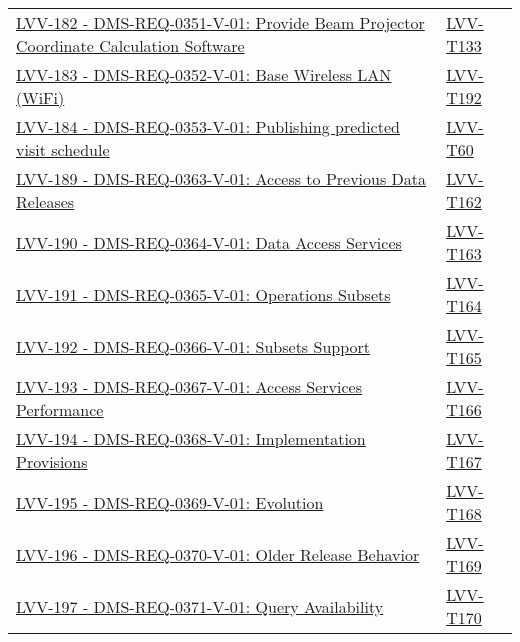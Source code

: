 \begin{longtable}[]{p{13cm}p{3cm}}
\href{https://jira.lsstcorp.org/browse/LVV-182}{LVV-182 -
DMS-REQ-0351-V-01: Provide Beam Projector Coordinate Calculation
Software} &
\protect\hyperlink{lvv-t133---verify-implementation-of-provide-beam-projector-coordinate-calculation-software-dms-req-0351}{LVV-T133}\tabularnewline
\href{https://jira.lsstcorp.org/browse/LVV-183}{LVV-183 -
DMS-REQ-0352-V-01: Base Wireless LAN (WiFi)} &
\protect\hyperlink{lvv-t192---verify-implementation-of-base-wireless-lan-wifi-dms-req-0352}{LVV-T192}\tabularnewline
\href{https://jira.lsstcorp.org/browse/LVV-184}{LVV-184 -
DMS-REQ-0353-V-01: Publishing predicted visit schedule} &
\protect\hyperlink{lvv-t60---verify-implementation-of-publishing-predicted-visit-schedule-dms-req-0353}{LVV-T60}\tabularnewline
\href{https://jira.lsstcorp.org/browse/LVV-189}{LVV-189 -
DMS-REQ-0363-V-01: Access to Previous Data Releases} &
\protect\hyperlink{lvv-t162---verify-implementation-of-access-to-previous-data-releases-dms-req-0363}{LVV-T162}\tabularnewline
\href{https://jira.lsstcorp.org/browse/LVV-190}{LVV-190 -
DMS-REQ-0364-V-01: Data Access Services} &
\protect\hyperlink{lvv-t163---verify-implementation-of-data-access-services-dms-req-0364}{LVV-T163}\tabularnewline
\href{https://jira.lsstcorp.org/browse/LVV-191}{LVV-191 -
DMS-REQ-0365-V-01: Operations Subsets} &
\protect\hyperlink{lvv-t164---verify-implementation-of-operations-subsets-dms-req-0365}{LVV-T164}\tabularnewline
\href{https://jira.lsstcorp.org/browse/LVV-192}{LVV-192 -
DMS-REQ-0366-V-01: Subsets Support} &
\protect\hyperlink{lvv-t165---verify-implementation-of-subsets-support-dms-req-0366}{LVV-T165}\tabularnewline
\href{https://jira.lsstcorp.org/browse/LVV-193}{LVV-193 -
DMS-REQ-0367-V-01: Access Services Performance} &
\protect\hyperlink{lvv-t166---verify-implementation-of-access-services-performance-dms-req-0367}{LVV-T166}\tabularnewline
\href{https://jira.lsstcorp.org/browse/LVV-194}{LVV-194 -
DMS-REQ-0368-V-01: Implementation Provisions} &
\protect\hyperlink{lvv-t167---verify-implementation-of-implementation-provisions-dms-req-0368}{LVV-T167}\tabularnewline
\href{https://jira.lsstcorp.org/browse/LVV-195}{LVV-195 -
DMS-REQ-0369-V-01: Evolution} &
\protect\hyperlink{lvv-t168---verify-implementation-of-evolution-dms-req-0369}{LVV-T168}\tabularnewline
\href{https://jira.lsstcorp.org/browse/LVV-196}{LVV-196 -
DMS-REQ-0370-V-01: Older Release Behavior} &
\protect\hyperlink{lvv-t169---verify-implementation-of-older-release-behavior-dms-req-0370}{LVV-T169}\tabularnewline
\href{https://jira.lsstcorp.org/browse/LVV-197}{LVV-197 -
DMS-REQ-0371-V-01: Query Availability} &
\protect\hyperlink{lvv-t170---verify-implementation-of-query-availability-dms-req-0371}{LVV-T170}\tabularnewline
\bottomrule
\end{longtable}

